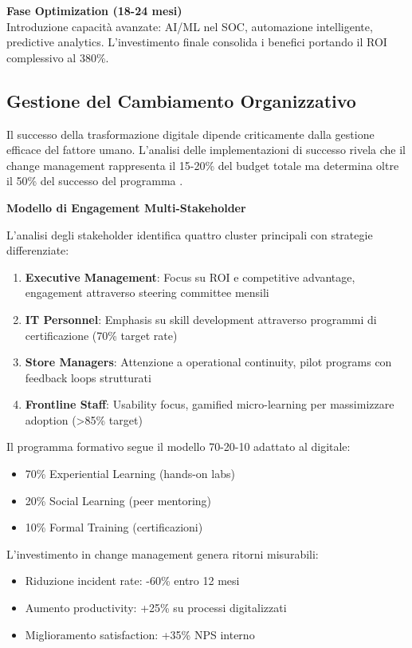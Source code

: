 \textbf{Fase Optimization (18-24 mesi)}\\
Introduzione capacità avanzate: AI/ML nel SOC, automazione intelligente, predictive analytics. L'investimento finale consolida i benefici portando il ROI complessivo al 380\%.

\subsection{Gestione del Cambiamento Organizzativo}

Il successo della trasformazione digitale dipende criticamente dalla gestione efficace del fattore umano. L'analisi delle implementazioni di successo rivela che il change management rappresenta il 15-20\% del budget totale ma determina oltre il 50\% del successo del programma \autocite{westerman2024leading}.

\textbf{Modello di Engagement Multi-Stakeholder}

L'analisi degli stakeholder identifica quattro cluster principali con strategie differenziate:

\begin{enumerate}
    \item \textbf{Executive Management}: Focus su ROI e competitive advantage, engagement attraverso steering committee mensili
    \item \textbf{IT Personnel}: Emphasis su skill development attraverso programmi di certificazione (70\% target rate)
    \item \textbf{Store Managers}: Attenzione a operational continuity, pilot programs con feedback loops strutturati
    \item \textbf{Frontline Staff}: Usability focus, gamified micro-learning per massimizzare adoption (>85\% target)
\end{enumerate}

Il programma formativo segue il modello 70-20-10 adattato al digitale:
\begin{itemize}
    \item 70\% Experiential Learning (hands-on labs)
    \item 20\% Social Learning (peer mentoring)
    \item 10\% Formal Training (certificazioni)
\end{itemize}

L'investimento in change management genera ritorni misurabili:
\begin{itemize}
    \item Riduzione incident rate: -60\% entro 12 mesi
    \item Aumento productivity: +25\% su processi digitalizzati
    \item Miglioramento satisfaction: +35\% NPS interno
\end{itemize}

